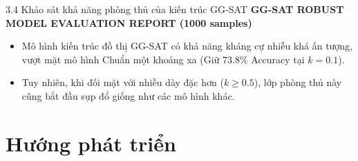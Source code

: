 \documentclass[10pt, xcolor=table]{beamer}
\begin{document}
\begin{frame}{3.4 Khảo sát khả năng phòng thủ của kiến trúc GG-SAT}
    \centering
    \small \textbf{GG-SAT ROBUST MODEL EVALUATION REPORT (1000 samples)}
    \vspace{0.1cm}

    \vspace{0.2cm}
    \begin{itemize}
        \item Mô hình kiến trúc đồ thị GG-SAT có khả năng kháng cự nhiễu khá ấn tượng, vượt mặt mô hình Chuẩn một khoảng xa (Giữ $73.8\%$ Accuracy tại $k=0.1$).
        \item Tuy nhiên, khi đối mặt với nhiễu dày đặc hơn ($k \ge 0.5$), lớp phòng thủ này cũng bắt đầu sụp đổ giống như các mô hình khác.
    \end{itemize}
\end{frame}

\section{Hướng phát triển}
\end{document}
